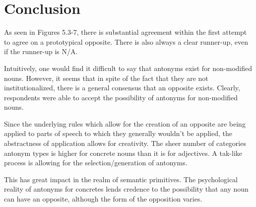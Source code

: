 \section {Conclusion}
As seen in Figures 5.3-7, there is substantial agreement within the first attempt to agree on a prototypical opposite.  There is also always a clear runner-up, even if the runner-up is N/A.  

Intuitively, one would find it difficult to say that antonyms exist for non-modified nouns.  However, it seems that in spite of the fact that they are not institutionalized, there is a general consensus that an opposite exists.  Clearly, respondents were able to accept the possibility of antonyms for non-modified nouns. 

Since the underlying rules which allow for the creation of an opposite are being applied to parts of speech to which they generally wouldn’t be applied, the abstractness of application allows for creativity.  The sheer number of categories antonym types is higher for concrete nouns than it is for adjectives.  A tak-like process is allowing for the selection/generation of antonyms.

This has great impact in the realm of semantic primitives.  The psychological reality of antonyms for concretes lends credence to the possibility that any noun can have an opposite, although the form of the opposition varies.

